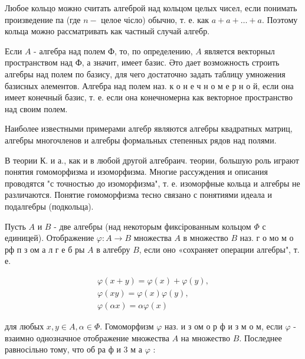 \documentclass[10pt]{article}
\begin{document}
Любое кольцо можно считать алгеброй над кольцом целых чисел, если понимать произведение па (где $n-$ целое чісло) обычно, т. е. как $a+a+\ldots+a$. Поэтому кольца можно рассматривать как частный случай алгебр.



Если $A$ - алгебра над полем Ф, то, по определению, $A$ является векторныл пространством над Ф, а значит, имеет базис. Әто дает возможность строить алгебры над полем по базису, для чего достаточно задать таблицу умножения базисных әлементов. Алгебра над полем наз. к о н е ч н о м е р н о й, если она имеет конечный базис, т. е. если она конечномерна как векторное пространство над своим полем.



Наиболее известными примерами алгебр являются алгебры квадратных матриц, алгебры многочленов и алгебры формальных степенных рядов над полями.



В теории К. и а., как и в любой другой алгебраич. теории, большую роль играют понятия гомоморфизма и изоморфизма. Многие рассуждения и описания проводятся "с точностью до изоморфизма", т. е. изоморфные кольца и алгебры не различаются. Понятие гомоморфизма тесно связано с понятиями идеала и подалгебры (подкольца).



Пусть $A$ и $B$ - две алгебры (над некоторым фиксірованным кольцом $\Phi$ с единицей). Отображение $\varphi: A \rightarrow B$ множества $A$ в множество $B$ наз. г о мо м о рф п з ом а л г е б ры $A$ в алгебру $B$, если оно «сохраняет операции алгебры", т. е.



\[

\begin{gathered}

\varphi(x+y)=\varphi(x)+\varphi(y), \\

\varphi(x y)=\varphi(x) \varphi(y), \\

\varphi(\alpha x)=\alpha \varphi(x)

\end{gathered}

\]



для любых $x, y \in A, \alpha \in \Phi$. Гомоморфизм $\varphi$ наз. и з ом о р ф и з м о м, если $\varphi$ - взаимно однозначное отображение множества $A$ на множество $B$. Последнее равносільно тому, что об ра ф и 3 м а $\varphi$ :
\end{document}
